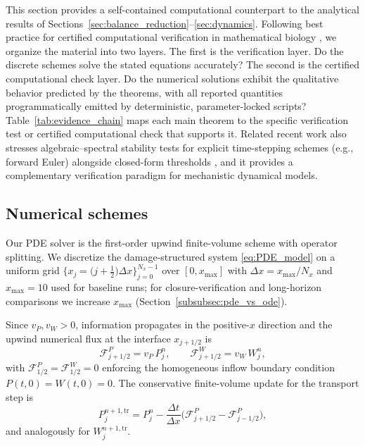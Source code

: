 \documentclass[pdflatex,sn-mathphys-ay]{sn-jnl}
\theoremstyle{thmstyleone}
\theoremstyle{definition}
\theoremstyle{remark}
\begin{document}
This section provides a self-contained computational counterpart to the analytical results
of Sections~\ref{sec:balance_reduction}--\ref{sec:dynamics}.
Following best practice for certified computational verification in mathematical biology
\citep{oberkampf_verification_2002,roache_verification_1998},
we organize the material into two layers.
The first is the verification layer. 
Do the discrete schemes solve the stated equations accurately?
The second is the certified computational check layer. 
Do the numerical solutions exhibit the qualitative
behavior predicted by the theorems, with all reported quantities programmatically emitted
by deterministic, parameter-locked scripts?
Table~\ref{tab:evidence_chain} maps each main theorem to the specific verification test or certified computational check that supports it. 
Related recent work also stresses algebraic–spectral stability tests for explicit time-stepping schemes (e.g., forward Euler) alongside closed-form thresholds \citep{wang_algebraicspectral_2026}, and it provides a complementary verification paradigm for mechanistic dynamical models.

\subsection{Numerical schemes}
\label{subsec:schemes}

Our PDE solver is the first-order upwind finite-volume scheme with operator splitting. We discretize the damage-structured system \eqref{eq:PDE_model} on a uniform grid
$\{x_j=\bigl(j+\tfrac12\bigr)\Delta x\}_{j=0}^{N_x-1}$ over $[0,x_{\max}]$
with $\Delta x=x_{\max}/N_x$ and 
$x_{\max}=10$ used for baseline runs; for closure-verification and long-horizon comparisons we increase $x_{\max}$ (Section~\ref{subsubsec:pde_vs_ode}).

Since $v_P,v_W>0$, information propagates in the positive-$x$ direction and the upwind
numerical flux at the interface $x_{j+1/2}$ is
\begin{equation}\label{eq:num_upwind_flux}
\mathcal F_{j+1/2}^P = v_P\, P_j^n, \qquad
\mathcal F_{j+1/2}^W = v_W\, W_j^n,
\end{equation}
with $\mathcal F_{1/2}^P=\mathcal F_{1/2}^W=0$ enforcing the homogeneous inflow boundary
condition $P(t,0)=W(t,0)=0$.
The conservative finite-volume update for the transport step is
\begin{equation}\label{eq:num_fv_transport}
P_j^{n+1,\mathrm{tr}} = P_j^n - \frac{\Delta t}{\Delta x}
\bigl(\mathcal F_{j+1/2}^P - \mathcal F_{j-1/2}^P\bigr),
\end{equation}
and analogously for $W_j^{n+1,\mathrm{tr}}$.
\end{document}
